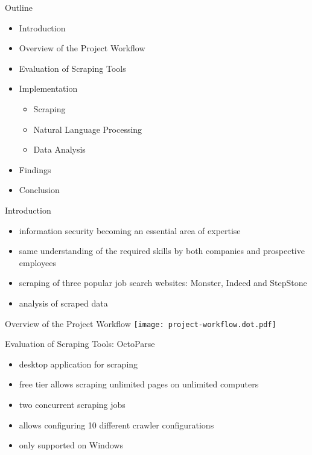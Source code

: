 \documentclass[aspectratio=169]{beamer}
\begin{document}
  \maketitle

  \begin{frame}{Outline}
    \begin{itemize}
      \item Introduction
      \item Overview of the Project Workflow
      \item Evaluation of Scraping Tools
      \item Implementation
      \begin{itemize}
        \item Scraping
        \item Natural Language Processing
        \item Data Analysis
      \end{itemize}
      \item Findings
      \item Conclusion
    \end{itemize}
  \end{frame}


  \begin{frame}{Introduction}
    \begin{itemize}
      \item information security becoming an essential area of expertise
      \item same understanding of the required skills by both companies and prospective employees
      \item scraping of three popular job search websites: Monster, Indeed and StepStone
      \item analysis of scraped data
    \end{itemize}
  \end{frame}

  \begin{frame}{Overview of the Project Workflow}
    \texttt{[image: project-workflow.dot.pdf]}
  \end{frame}

  \begin{frame}{Evaluation of Scraping Tools: OctoParse}
    \begin{itemize}
      \item desktop application for scraping
      \item free tier allows scraping unlimited pages on unlimited computers
      \item two concurrent scraping jobs
      \item allows configuring 10 different crawler configurations
      \item only supported on Windows
    \end{itemize}
  \end{frame}
\end{document}
